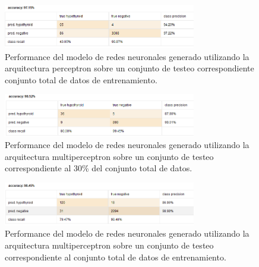\documentclass[osajnl,twocolumn,showpacs,superscriptaddress,10pt,floatfix]{revtex4-1} %
\begin{document}
\begin{figure}[h]
    \centering
    \includegraphics[width=0.75\textwidth]{models/perceptron_train_test_performance}
    \caption{Performance del modelo de redes neuronales generado utilizando la arquitectura perceptron sobre un conjunto de testeo correspondiente conjunto total de datos de entrenamiento.}
    \label{figure:perceptron_train_test_performance}
\end{figure}

\begin{figure}[h]
    \centering
    \includegraphics[width=0.75\textwidth]{models/multiperceptron_performance}
    \caption{Performance del modelo de redes neuronales generado utilizando la arquitectura multiperceptron sobre un conjunto de testeo correspondiente al 30\% del conjunto total de datos.}
    \label{figure:multiperceptron_performance}
\end{figure}

\begin{figure}[h]
    \centering
    \includegraphics[width=0.75\textwidth]{models/multiperceptron_train_test_performance}
    \caption{Performance del modelo de redes neuronales generado utilizando la arquitectura multiperceptron sobre un conjunto de testeo correspondiente al conjunto total de datos de entrenamiento.}
    \label{figure:multiperceptron_train_test_performance}
\end{figure}
\end{document}
